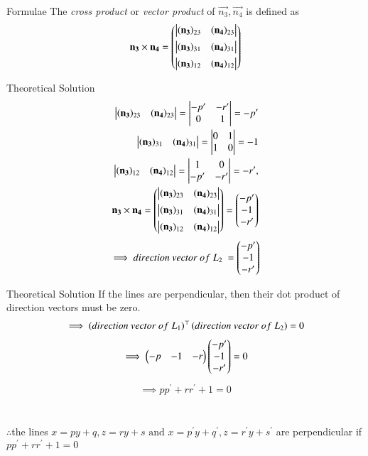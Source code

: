 \documentclass{beamer}
\begin{document}
\begin{frame}{Formulae}
The {\em cross product} or {\em vector product} of $\vec{n_3}, \vec{n_4}$ is defined as
\begin{align}
  \label{eq:cross3d}
	\mathbf{n_3} \times \mathbf{n_4} 
	 = \begin{pmatrix} \begin{vmatrix}(\mathbf{n_3})_{23} & (\mathbf{n_4})_{23}\end{vmatrix} \\[1ex] \begin{vmatrix}(\mathbf{n_3})_{31} & (\mathbf{n_4})_{31}\end{vmatrix} \\[1ex] \begin{vmatrix}(\mathbf{n_3})_{12}  & (\mathbf{n_4})_{12}\end{vmatrix}\end{pmatrix}
\end{align}
\end{frame}
\begin{frame}{Theoretical Solution}
\begin{align}
	\begin{vmatrix}(\mathbf{n_3})_{23}&(\mathbf{n_4})_{23}\end{vmatrix}=\begin{vmatrix}-p^{\prime} & -r^{\prime} \\ 0 & 1\end{vmatrix}=-p^{\prime}\\\
	\begin{vmatrix}(\mathbf{n_3})_{31}&(\mathbf{n_4})_{31}\end{vmatrix}=\begin{vmatrix}0 & 1 \\ 1 & 0\end{vmatrix}=-1\\
	\begin{vmatrix}(\mathbf{n_3})_{12}&(\mathbf{n_4})_{12}\end{vmatrix}=\begin{vmatrix}1 & 0 \\ -p^{\prime} & -r^{\prime}\end{vmatrix}=-r^{\prime},
	\\
	\mathbf{n_3}\times\mathbf{n_4}
	 =\begin{pmatrix} \begin{vmatrix}(\mathbf{n_3})_{23} & (\mathbf{n_4})_{23}\end{vmatrix} \\[1ex] \begin{vmatrix}(\mathbf{n_3})_{31} & (\mathbf{n_4})_{31}\end{vmatrix} \\[1ex] \begin{vmatrix}(\mathbf{n_3})_{12}  & (\mathbf{n_4})_{12}\end{vmatrix}\end{pmatrix}
=\begin{pmatrix}-p^{\prime}\\-1\\-r^{\prime}\end{pmatrix}
\end{align}
\begin{align}
    \implies direction\ vector\ of\ L_2\ = \begin{pmatrix}-p^{\prime}\\-1\\-r^{\prime}\end{pmatrix}
\end{align}
\end{frame}
\begin{frame}{Theoretical Solution}
If the lines are perpendicular, then their dot product of direction vectors must be zero.
\begin{align}
    \implies \brak{direction\ vector\ of\ L_1}^\top\brak{direction\ vector\ of\ L_2} = 0
\end{align}
\begin{align}
\implies \begin{pmatrix}-p & -1 & -r\end{pmatrix} \begin{pmatrix}-p^{\prime}\\-1\\-r^{\prime}\end{pmatrix} = 0
\end{align}
\begin{align}
\implies pp^{\prime}+rr^{\prime}+1=0
\end{align}\\
\\
$\therefore$the lines $x=py+q , z=ry+s \text{ and } x=p^{\prime}y+q^{\prime}, z=r^{\prime}y+s^{\prime} $ are perpendicular if $pp^{\prime}+rr^{\prime}+1=0$
\end{frame}
\end{document}
